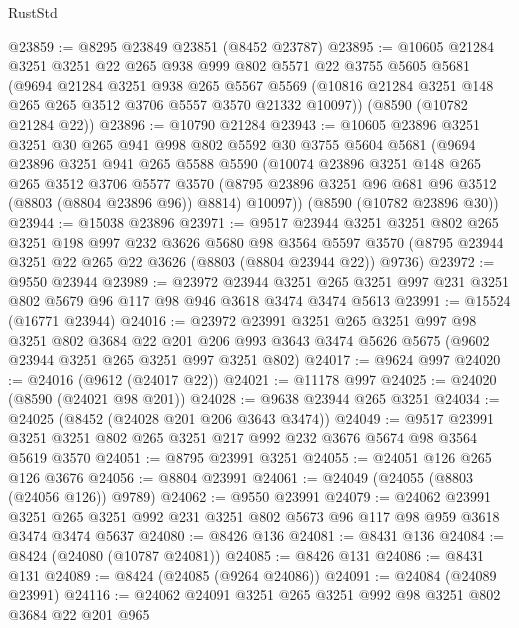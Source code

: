 \begin{lexlean}{RustStd}
\begin{coremodule}
@23859 := @8295 @23849 @23851 (@8452 @23787)
@23895 := @10605
    @21284
    @3251
    @3251
    @22
    @265
    @938
    @999
    @802
    @5571
    @22
    @3755
    @5605
    @5681
    (@9694
      @21284
      @3251
      @938
      @265
      @5567
      @5569
      (@10816 @21284 @3251 @148 @265 @265 @3512 @3706 @5557 @3570 @21332 @10097))
    (@8590 (@10782 @21284 @22))
@23896 := @10790 @21284
@23943 := @10605
    @23896
    @3251
    @3251
    @30
    @265
    @941
    @998
    @802
    @5592
    @30
    @3755
    @5604
    @5681
    (@9694
      @23896
      @3251
      @941
      @265
      @5588
      @5590
      (@10074
        @23896
        @3251
        @148
        @265
        @265
        @3512
        @3706
        @5577
        @3570
        (@8795 @23896 @3251 @96 @681 @96 @3512 (@8803 (@8804 @23896 @96)) @8814)
        @10097))
    (@8590 (@10782 @23896 @30))
@23944 := @15038 @23896
@23971 := @9517
    @23944
    @3251
    @3251
    @802
    @265
    @3251
    @198
    @997
    @232
    @3626
    @5680
    @98
    @3564
    @5597
    @3570
    (@8795 @23944 @3251 @22 @265 @22 @3626 (@8803 (@8804 @23944 @22)) @9736)
@23972 := @9550 @23944
@23989 := @23972
    @23944
    @3251
    @265
    @3251
    @997
    @231
    @3251
    @802
    @5679
    @96
    @117
    @98
    @946
    @3618
    @3474
    @3474
    @5613
@23991 := @15524 (@16771 @23944)
@24016 := @23972
    @23991
    @3251
    @265
    @3251
    @997
    @98
    @3251
    @802
    @3684
    @22
    @201
    @206
    @993
    @3643
    @3474
    @5626
    @5675
    (@9602 @23944 @3251 @265 @3251 @997 @3251 @802)
@24017 := @9624 @997
@24020 := @24016 (@9612 (@24017 @22))
@24021 := @11178 @997
@24025 := @24020 (@8590 (@24021 @98 @201))
@24028 := @9638 @23944 @265 @3251
@24034 := @24025 (@8452 (@24028 @201 @206 @3643 @3474))
@24049 := @9517 @23991 @3251 @3251 @802 @265 @3251 @217 @992 @232 @3676 @5674 @98 @3564 @5619 @3570
@24051 := @8795 @23991 @3251
@24055 := @24051 @126 @265 @126 @3676
@24056 := @8804 @23991
@24061 := @24049 (@24055 (@8803 (@24056 @126)) @9789)
@24062 := @9550 @23991
@24079 := @24062
    @23991
    @3251
    @265
    @3251
    @992
    @231
    @3251
    @802
    @5673
    @96
    @117
    @98
    @959
    @3618
    @3474
    @3474
    @5637
@24080 := @8426 @136
@24081 := @8431 @136
@24084 := @8424 (@24080 (@10787 @24081))
@24085 := @8426 @131
@24086 := @8431 @131
@24089 := @8424 (@24085 (@9264 @24086))
@24091 := @24084 (@24089 @23991)
@24116 := @24062
    @24091
    @3251
    @265
    @3251
    @992
    @98
    @3251
    @802
    @3684
    @22
    @201
    @965

\end{coremodule}
\end{lexlean}
